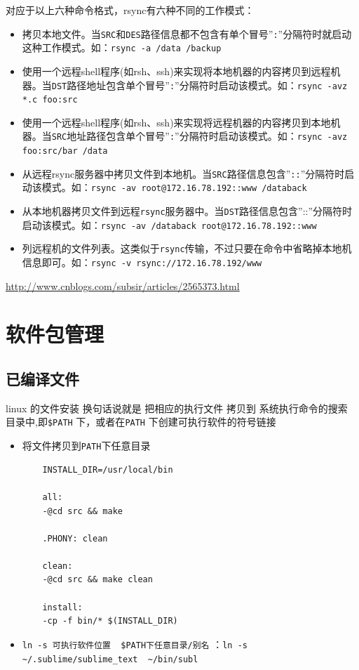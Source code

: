 \documentclass[UTF8,a4paper,12pt]{ctexbook}
\begin{document}
			对应于以上六种命令格式，rsync有六种不同的工作模式：
				\begin{itemize}
					\item 拷贝本地文件。当\verb|SRC|和\verb|DES|路径信息都不包含有单个冒号”\verb|:|”分隔符时就启动这种工作模式。如：\verb|rsync -a /data /backup|
					\item 使用一个远程shell程序(如rsh、ssh)来实现将本地机器的内容拷贝到远程机器。当\verb|DST|路径地址包含单个冒号”\verb|:|”分隔符时启动该模式。如：\verb|rsync -avz *.c foo:src|
					\item 使用一个远程shell程序(如rsh、ssh)来实现将远程机器的内容拷贝到本地机器。当\verb|SRC|地址路径包含单个冒号”\verb|:|”分隔符时启动该模式。如：\verb|rsync -avz foo:src/bar /data|
					\item 从远程rsync服务器中拷贝文件到本地机。当\verb|SRC|路径信息包含”\verb|::|”分隔符时启动该模式。如：\verb|rsync -av root@172.16.78.192::www /databack|
					\item 从本地机器拷贝文件到远程\verb|rsync|服务器中。当\verb|DST|路径信息包含”::”分隔符时启动该模式。如：\verb|rsync -av /databack root@172.16.78.192::www|
					\item 列远程机的文件列表。这类似于\verb|rsync|传输，不过只要在命令中省略掉本地机信息即可。如：\verb|rsync -v rsync://172.16.78.192/www|
				\end{itemize}
				
			\url{http://www.cnblogs.com/subsir/articles/2565373.html}

	
	\section{软件包管理}
		\subsection{已编译文件}
		linux 的文件安装 换句话说就是 把相应的执行文件 拷贝到 系统执行命令的搜索 目录中,即\verb|$PATH| 下，或者在\verb|PATH| 下创建可执行软件的符号链接
		
			\begin{itemize}
				\item 将文件拷贝到\verb|PATH|下任意目录
					\begin{lstlisting}
	INSTALL_DIR=/usr/local/bin
				
	all:
	-@cd src && make
					
	.PHONY: clean
					
	clean:
	-@cd src && make clean
					
	install:
	-cp -f bin/* $(INSTALL_DIR)
					\end{lstlisting}
				\item \verb|ln -s 可执行软件位置  $PATH下任意目录/别名|  ：\verb|ln -s ~/.sublime/sublime_text  ~/bin/subl|
			\end{itemize}
		
\end{document}
